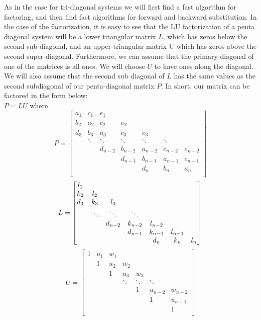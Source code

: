 \documentclass[12pt]{article}
\begin{document}
	As in the case for tri-diagonal systems we will first find a fast algorithm for factoring, and then find fast algorithms for forward and backward substitution. In the case of the factorization, it is easy to see that the LU factorization of a penta diagonal system will be a lower triangular matrix $L$, which has zeros below the second sub-diagonal, and an upper-triangular matrix U which has zeros above the second super-diagonal. Furthermore, we can assume that the primary diagonal of one of the matrices is all ones. We will choose $U$ to have ones along the diagonal. We will also assume that the second sub diagonal of $L$ has the same values as the second subdiagonal of our penta-diagonal matrix $P$. In short, our matrix can be factored in the form below: \\
	$P=LU$ where \\
	$$P = \begin{bmatrix}
		a_1 & c_1 & e_1\\
		b_2 & a_2 & c_2 & e_2\\
		d_3 & b_3 & a_3 & c_3 & e_3\\
		 & \ddots & \ddots & \ddots  & \ddots & \ddots\\
		 &  & d_{n-2} & b_{n-2} & a_{n-2} & c_{n-2} & e_{n-2}\\
		 &  & & d_{n-1} & b_{n-1} & a_{n-1} & c_{n-1} \\
		 &  &  &  & d_{n} & b_{n} & a_{n} \\
	\end{bmatrix}$$
	$$L = \begin{bmatrix}
		l_1 \\
		k_2 & l_2 \\
		d_3 & k_3 & l_3 \\
		& \ddots & \ddots & \ddots \\
		&  & d_{n-2} & k_{n-2} & l_{n-2} \\
		&  & & d_{n-1} & k_{n-1} & l_{n-1}\\
		&  &  &  & d_{n} & k_{n} & l_{n} \\
	\end{bmatrix} \\
	$$
	$$U = \begin{bmatrix}
	1 & u_1 & w_1\\
	& 1 & u_2 & w_2\\
	&  & 1 & u_3 & w_3\\
	&  &  & \ddots  & \ddots & \ddots\\
	&  &  &  & 1 & u_{n-2} & w_{n-2}\\
	&  & &  &  & 1 & u_{n-1} \\
	&  &  &  &  &  & 1 \\
	\end{bmatrix}$$
\end{document}
